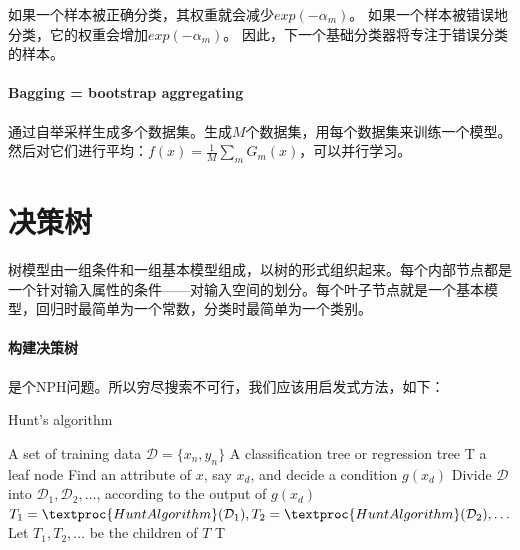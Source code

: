 如果一个样本被正确分类，其权重就会减少$exp(-\alpha_m)$。
如果一个样本被错误地分类，它的权重会增加$exp(-\alpha_m)$。
因此，下一个基础分类器将专注于错误分类的样本。

\paragraph{Bagging = bootstrap aggregating} 通过自举采样生成多个数据集。生成$M$个数据集，用每个数据集来训练一个模型。然后对它们进行平均：$f(x) = \frac{1}{M} \sum_m G_m(x)$，可以并行学习。

\section{决策树}
树模型由一组条件和一组基本模型组成，以树的形式组织起来。每个内部节点都是一个针对输入属性的条件——对输入空间的划分。每个叶子节点就是一个基本模型，回归时最简单为一个常数，分类时最简单为一个类别。

\paragraph{构建决策树} 是个NPH问题。所以穷尽搜索不可行，我们应该用启发式方法，如下：
\begin{algorithm}[H]
\caption{Hunt's algorithm}
\label{alg:hunt}
\begin{algorithmic}[1]
\Require A set of training data $\mathcal{D} = \{x_n, y_n\}$
\Ensure A classification tree or regression tree T
\State \Return a leaf node
\Else
\State Find an attribute of $x$, say $x_d$, and decide a condition $g(x_d)$
\State Divide $\mathcal{D}$ into $\mathcal{D}_1, \mathcal{D}_2, \ldots$, according to the output of $g(x_d)$
\State $T_1 = \textproc{HuntAlgorithm}(\mathcal{D}_1), T_2 = \textproc{HuntAlgorithm}(\mathcal{D}_2), \ldots$
\State Let $T_1, T_2, \ldots$ be the children of $T$
\EndIf
\State \Return T
\EndFunction
\end{algorithmic}
\end{algorithm}

